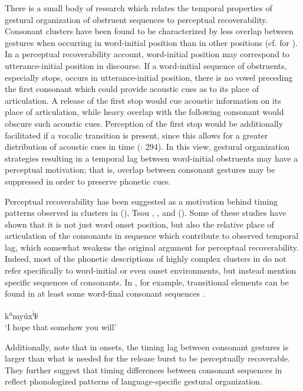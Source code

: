   There is a small body of research which relates the temporal properties of gestural organization of obstruent sequences to perceptual recoverability. Consonant clusters have been found to be characterized by less overlap between gestures when occurring in word-initial position than in other positions (cf. \citealt{Byrd1996a} for ). In a perceptual recoverability account, word-initial position may correspond to utterance-initial position in discourse. If a word-initial sequence of obstruents, especially stops, occurs in utterance-initial position, there is no vowel preceding the first consonant which could provide acoustic cues as to its place of articulation. A release of the first stop would cue acoustic information on its place of articulation, while heavy overlap with the following consonant would obscure such acoustic cues. Perception of the first stop would be additionally facilitated if a vocalic transition is present, since this allows for a greater distribution of acoustic cues in time (\citealt{RidouaneFougeron2011}: 294). In this view, gestural organization strategies resulting in a temporal lag between word-initial obstruents may have a perceptual motivation; that is, overlap between consonant gestures may be suppressed in order to preserve phonetic cues.

  Perceptual recoverability has been suggested as a motivation behind timing patterns observed in clusters in  (\citealt{SilvermanJun1994}), Tsou \citep{Wright1996},  \citep{ChitoranEtAl2002}, and  (\citealt{RidouaneFougeron2011}). Some of these studies have shown that it is not just word onset position, but also the relative place of articulation of the consonants in sequence which contribute to observed temporal lag, which somewhat weakens the original argument for perceptual recoverability. Indeed, most of the phonetic descriptions of highly complex clusters in  do not refer specifically to word-initial or even onset environments, but instead mention specific sequences of consonants. In , for example, transitional elements can be found in at least some word-final consonant sequences .

\ea\label{ex:8.9}

k\textsuperscript{a}myúx\textsuperscript{i}ɬʲ\\
\glt ‘I hope that somehow you will’
\citep[47]{Crawford1966}
\z

Additionally, \citet{ChitoranCohn2009} note that in  onsets, the timing lag between consonant gestures is larger than what is needed for the release burst to be perceptually recoverable. They further suggest that timing differences between consonant sequences in  reflect phonologized patterns of language-specific gestural organization.

